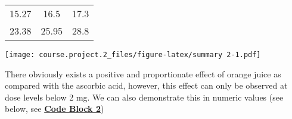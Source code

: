 \documentclass[]{article}
\begin{document}
\begin{longtable}[c]{@{}ccc@{}}
\begin{minipage}[t]{0.08\columnwidth}\centering\strut
15.27
\strut\end{minipage} &
\begin{minipage}[t]{0.16\columnwidth}\centering\strut
16.5
\strut\end{minipage} &
\begin{minipage}[t]{0.06\columnwidth}\centering\strut
17.3
\strut\end{minipage}\tabularnewline
\begin{minipage}[t]{0.08\columnwidth}\centering\strut
23.38
\strut\end{minipage} &
\begin{minipage}[t]{0.16\columnwidth}\centering\strut
25.95
\strut\end{minipage} &
\begin{minipage}[t]{0.06\columnwidth}\centering\strut
28.8
\strut\end{minipage}\tabularnewline
\bottomrule
\end{longtable}

\texttt{[image: course.project.2\_files/figure-latex/summary 2-1.pdf]}

There obviously exists a positive and proportionate effect of orange
juice as compared with the ascorbic acid, however, this effect can only
be observed at dose levels below 2 mg. We can also demonstrate this in
numeric values (see below, see \textbf{\hyperref[code-block-2]{Code
Block 2}})
\end{document}
